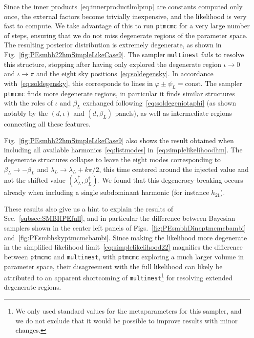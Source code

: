 \documentclass[aps,showpacs,twocolumn,prd,superscriptaddress,nofootinbib]{revtex4-1}
\newcommand\betaL{{\beta_{L}}}
\newcommand\lambdaL{{\lambda_{L}}}
\newcommand\psiL{{\psi_{L}}}
\begin{document}
Since the inner products~\eqref{eq:innerproductlmlpmp} are constants computed only once, the external factors become trivially inexpensive, and the likelihood is very fast to compute. We take advantage of this to run \texttt{ptmcmc} for a very large number of steps, ensuring that we do not miss degenerate regions of the parameter space. The resulting posterior distribution is extremely degenerate, as shown in Fig.~\ref{fig:PEsmbh22hmSimpleLikeCase9}. The sampler \texttt{multinest} fails to resolve this structure, stopping after having only explored the degenerate region $\iota \rightarrow 0$ and $\iota \rightarrow \pi$ and the eight sky positions~\eqref{eq:soldegensky}. In accordance with~\eqref{eq:soldegensky}, this corresponds to lines in $\varphi \pm \psiL = \mathrm{const}$. The sampler \texttt{ptmcmc} finds more degenerate regions, in particular it finds similar structures with the roles of $\iota$ and $\betaL$ exchanged following~\eqref{eq:soldegeniotaphi} (as shown notably by the $(d,\iota)$ and $(d,\betaL)$ panels), as well as intermediate regions connecting all these features.

Fig.~\ref{fig:PEsmbh22hmSimpleLikeCase9} also shows the result obtained when including all available harmonics~\eqref{eq:listmodes} in~\eqref{eq:simplelikelihoodhm}. The degenerate structures collapse to leave the eight modes corresponding to $\betaL \rightarrow - \betaL$ and $\lambdaL \rightarrow \lambdaL + k\pi/2$, this time centered around the injected value and not the shifted value $(\lambda_{L}^{\dagger}, \beta_{L}^{\dagger})$. We found that this degeneracy-breaking occurs already when including a single subdominant harmonic (for instance $h_{21}$).

These results also give us a hint to explain the results of Sec.~\ref{subsec:SMBHPEfull}, and in particular the difference between Bayesian samplers shown in the center left panels of Figs.~\ref{fig:PEsmbhDincptmcmcbambi} and~\ref{fig:PEsmbhskyptmcmcbambi}. Since making the likelihood more degenerate in the simplified likelihood limit~\eqref{eq:simplelikelihood22} magnifies the difference between \texttt{ptmcmc} and \texttt{multinest}, with \texttt{ptmcmc} exploring a much larger volume in parameter space, their disagreement with the full likelihood can likely be attributed to an apparent shortcoming of \texttt{multinest}\footnote{We only used standard values for the metaparameters for this sampler, and we do not exclude that it would be possible to improve results with minor changes.} for resolving extended degenerate regions.
\end{document}
